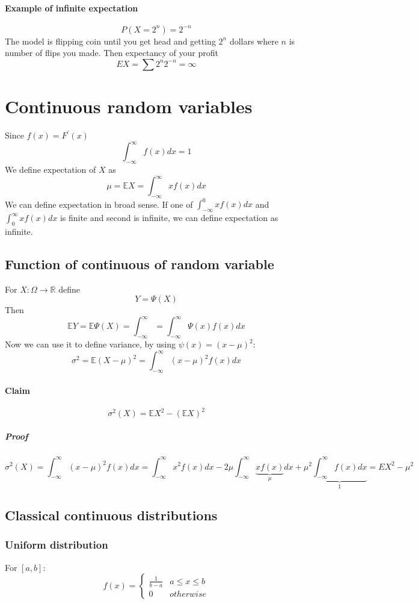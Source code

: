 \paragraph{Example of infinite expectation}
$$P(X = 2^n) = 2^{-n}$$
The model is flipping coin until you get head and getting $2^n$ dollars where $n$ is number of flips you made.
Then expectancy of your profit
$$EX = \sum 2^n 2^{-n} = \infty$$

\section{ Continuous random variables}
Since $f(x) = F^\prime(x)$
$$\int_{-\infty}^{\infty} f(x) dx = 1$$
We define expectation of $X$ as
$$\mu = \mathbb{E}X = \int_{-\infty}^{\infty} xf(x) dx$$
We can define expectation in broad sense. If one of $\int_{-\infty}^0 xf(x) dx$ and $\int_0^\infty xf(x) dx$ is finite and second is infinite, we can define expectation as infinite.

 \subsection{Function of continuous of random variable}
 For $X: \Omega \to \mathbb{R}$ define 
 $$Y = \Psi(X)$$
 Then
 $$\mathbb{E}Y = \mathbb{E} \Psi(X) = \int_{-\infty}^\infty = \int_{-\infty}^\infty \Psi(x) f(x) dx$$
Now we can use it to define variance, by using $\psi(x) = (x-\mu)^2$:
$$\sigma^2 = \mathbb{E}(X-\mu)^2 = \int_{-\infty}^\infty (x-\mu)^2 f(x)dx$$

\paragraph{Claim}
$$\sigma^2(X) = \mathbb{E}X^2 - (\mathbb{E}X)^2$$
\subparagraph{Proof}
$$\sigma^2(X) = \int_{-\infty}^\infty  (x-\mu)^2 f(x) dx =\int_{-\infty}^\infty x^2 f(x) dx-2\mu \int_{-\infty}^\infty  \underbrace{x f(x)}_{\mu} dx+\mu^2\underbrace{\int_{-\infty}^\infty  f(x) dx}_{1} = EX^2-\mu^2$$

\subsection{Classical continuous distributions}
\subsubsection{Uniform distribution}
For $[a,b]$:
$$f(x) = \begin{cases}
\frac{1}{b-a}&  a \leq x\leq b\\0& otherwise
\end{cases}$$

